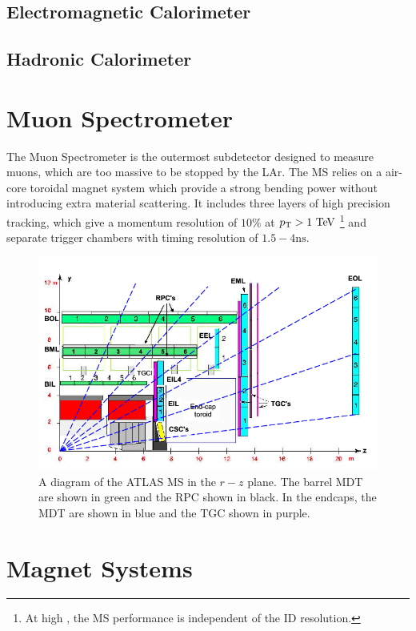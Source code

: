 \subsection{Electromagnetic Calorimeter}

\subsection{Hadronic Calorimeter}


\section{Muon Spectrometer}
The Muon Spectrometer is the outermost subdetector designed to measure muons, which are too massive to be stopped by the \ac{LAr}. The \ac{MS} relies on a air-core toroidal magnet system which provide a strong bending power without introducing extra material scattering. It includes three layers of high precision tracking, which give a momentum resolution of $10\%$ at $\pT > 1 \TeV$ \footnote{At high \pt, the \ac{MS} performance is independent of the \ac{ID} resolution.} and separate trigger chambers with timing resolution of $1.5-4 \textrm{ns}$. 

\begin{figure}[htbp]
\centering
\includegraphics[width=.8\textwidth]{figures/Detector/atlas-ms.png}
\caption{A diagram of the \ac{ATLAS} \ac{MS} in the $r-z$ plane. The barrel \ac{MDT} are shown in green and the \ac{RPC} shown in black. In the endcaps, the \ac{MDT} are shown in blue and the \ac{TGC} shown in purple. }
\label{fig:atlas-ms}
\end{figure}


\section{Magnet Systems}
\label{sec:magnets}

